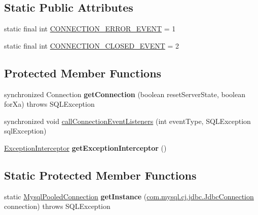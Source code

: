 \subsection*{Static Public Attributes}
\begin{DoxyCompactItemize}
\item 
static final int \mbox{\hyperlink{classcom_1_1mysql_1_1cj_1_1jdbc_1_1_mysql_pooled_connection_ab6f2b2f8756ecc1ae0672be11de86066}{C\+O\+N\+N\+E\+C\+T\+I\+O\+N\+\_\+\+E\+R\+R\+O\+R\+\_\+\+E\+V\+E\+NT}} = 1
\item 
static final int \mbox{\hyperlink{classcom_1_1mysql_1_1cj_1_1jdbc_1_1_mysql_pooled_connection_a0d53e8b5f1ba1fb67bf1f46adfd2dd3f}{C\+O\+N\+N\+E\+C\+T\+I\+O\+N\+\_\+\+C\+L\+O\+S\+E\+D\+\_\+\+E\+V\+E\+NT}} = 2
\end{DoxyCompactItemize}
\subsection*{Protected Member Functions}
\begin{DoxyCompactItemize}
\item 
\mbox{\label{classcom_1_1mysql_1_1cj_1_1jdbc_1_1_mysql_pooled_connection_af11a94c2e295f24a352a705b8cec6318}} 
synchronized Connection {\bfseries get\+Connection} (boolean reset\+Server\+State, boolean for\+Xa)  throws S\+Q\+L\+Exception 
\item 
synchronized void \mbox{\hyperlink{classcom_1_1mysql_1_1cj_1_1jdbc_1_1_mysql_pooled_connection_a6b4c7d8f141c670b4fd01246fb88d45b}{call\+Connection\+Event\+Listeners}} (int event\+Type, S\+Q\+L\+Exception sql\+Exception)
\item 
\mbox{\label{classcom_1_1mysql_1_1cj_1_1jdbc_1_1_mysql_pooled_connection_a900b07bbc0861fcdc04ef70092ce2ee0}} 
\mbox{\hyperlink{interfacecom_1_1mysql_1_1cj_1_1exceptions_1_1_exception_interceptor}{Exception\+Interceptor}} {\bfseries get\+Exception\+Interceptor} ()
\end{DoxyCompactItemize}
\subsection*{Static Protected Member Functions}
\begin{DoxyCompactItemize}
\item 
\mbox{\label{classcom_1_1mysql_1_1cj_1_1jdbc_1_1_mysql_pooled_connection_a032132b2437e23862f9d1f8d2c0788c0}} 
static \mbox{\hyperlink{classcom_1_1mysql_1_1cj_1_1jdbc_1_1_mysql_pooled_connection}{Mysql\+Pooled\+Connection}} {\bfseries get\+Instance} (\mbox{\hyperlink{interfacecom_1_1mysql_1_1cj_1_1jdbc_1_1_jdbc_connection}{com.\+mysql.\+cj.\+jdbc.\+Jdbc\+Connection}} connection)  throws S\+Q\+L\+Exception 
\end{DoxyCompactItemize}


